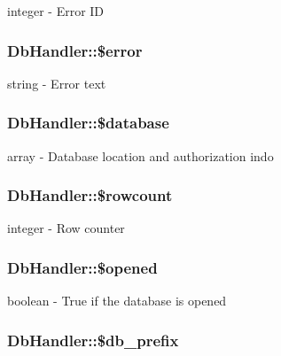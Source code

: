 integer - Error ID \hypertarget{classDbHandler_de79e11156abbfc180864beb5b9df377}{
\subsubsection{\setlength{\rightskip}{0pt plus 5cm}DbHandler::\$error}}
\label{classDbHandler_de79e11156abbfc180864beb5b9df377}


string - Error text \hypertarget{classDbHandler_faac5248f9ee59786b48a7b51f318940}{
\subsubsection{\setlength{\rightskip}{0pt plus 5cm}DbHandler::\$database}}
\label{classDbHandler_faac5248f9ee59786b48a7b51f318940}


array - Database location and authorization indo \hypertarget{classDbHandler_56a7ae4bd7d842c85f3fe8052aecbfef}{
\subsubsection{\setlength{\rightskip}{0pt plus 5cm}DbHandler::\$rowcount}}
\label{classDbHandler_56a7ae4bd7d842c85f3fe8052aecbfef}


integer - Row counter \hypertarget{classDbHandler_71e36ffbff0d157b1d91dc000bc6f821}{
\subsubsection{\setlength{\rightskip}{0pt plus 5cm}DbHandler::\$opened}}
\label{classDbHandler_71e36ffbff0d157b1d91dc000bc6f821}


boolean - True if the database is opened \hypertarget{classDbHandler_19af96598e7f72673fc5da26ad77731b}{
\subsubsection{\setlength{\rightskip}{0pt plus 5cm}DbHandler::\$db\_\-prefix}}
\label{classDbHandler_19af96598e7f72673fc5da26ad77731b}


